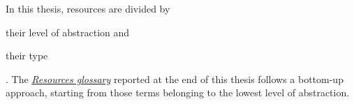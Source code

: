 In this thesis, resources are divided by
\begin{mylist}
    \item their level of abstraction and
    \item their type
\end{mylist}.
The \hyperref[resources_glossary]{\textit{Resources glossary}} reported at the end of this thesis follows a bottom-up approach, starting from those terms belonging to the lowest level of abstraction.

\begin{comment}
    \begin{itemize}
        \item \textbf{Physical resources}:
        \label{gls:resource:physical}
        set of physical hardware component of limited availability within a computer system. 
        
        \begin{itemize}
            \item \textbf{Physical server resources}:
            \label{gls:resource:physical:server}
            resources of physical server machines.
            
            \item \textbf{Physical switch resources}:
            \label{gls:resource:physical:switch}
            resources of physical switches, network accelerators, middle-boxes and of every kind of network device originally intended to forward packets.
        \end{itemize}
        
        \item \textbf{Logical resources}:
        \label{gls:resource:logical}
        logical representation of physical resources.
        
        \begin{itemize}
            \item \textbf{Logical server resources}:
            \label{gls:resource:logical:server}
            virtualized server physical resources, often implemented by means of \glspl{vm}, containers or entire physical servers.
            
            \item \textbf{Logical switch resources}:
            \label{gls:resource:logical:switch}
            logical representation of physical switch resources not mapped to any physical switch device.
            
            \item \textbf{Logical edge resources}:
            \label{gls:resource:logical:edge}
            properties of virtual connections between logical resources, e.g., bandwidth, latency, etc.
        \end{itemize}
        

\end{comment}

